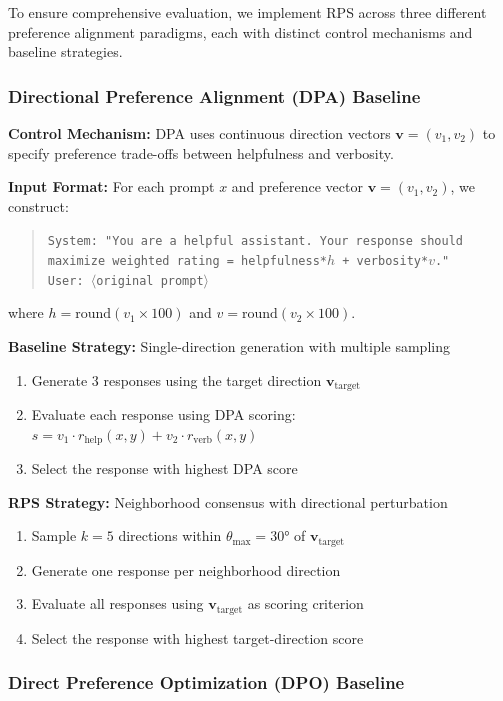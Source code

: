 \documentclass{article} %
\begin{document}
To ensure comprehensive evaluation, we implement RPS across three different preference alignment paradigms, each with distinct control mechanisms and baseline strategies.

\subsubsection{Directional Preference Alignment (DPA) Baseline}

\textbf{Control Mechanism:} DPA uses continuous direction vectors $\mathbf{v} = (v_1, v_2)$ to specify preference trade-offs between helpfulness and verbosity.

\textbf{Input Format:} For each prompt $x$ and preference vector $\mathbf{v} = (v_1, v_2)$, we construct:
\begin{quote}
\texttt{System: "You are a helpful assistant. Your response should maximize weighted rating = helpfulness*$h$ + verbosity*$v$."} \\
\texttt{User: $\langle$original prompt$\rangle$}
\end{quote}
where $h = \text{round}(v_1 \times 100)$ and $v = \text{round}(v_2 \times 100)$.

\textbf{Baseline Strategy:} Single-direction generation with multiple sampling
\begin{enumerate}
    \item Generate 3 responses using the target direction $\mathbf{v}_{\text{target}}$
    \item Evaluate each response using DPA scoring: $s = v_1 \cdot r_{\text{help}}(x,y) + v_2 \cdot r_{\text{verb}}(x,y)$
    \item Select the response with highest DPA score
\end{enumerate}

\textbf{RPS Strategy:} Neighborhood consensus with directional perturbation
\begin{enumerate}
    \item Sample $k=5$ directions within $\theta_{\max}=30°$ of $\mathbf{v}_{\text{target}}$
    \item Generate one response per neighborhood direction
    \item Evaluate all responses using $\mathbf{v}_{\text{target}}$ as scoring criterion
    \item Select the response with highest target-direction score
\end{enumerate}

\subsubsection{Direct Preference Optimization (DPO) Baseline}
\end{document}
